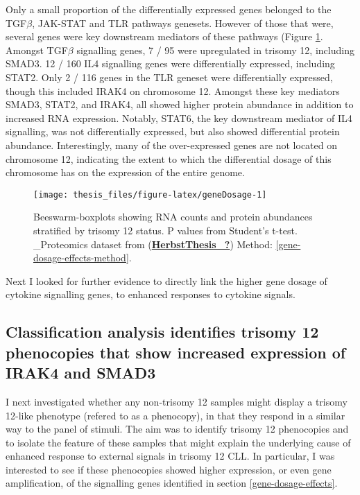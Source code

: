\documentclass[11pt, a4paper, twosided]{book}
\begin{document}
Only a small proportion of the differentially expressed genes belonged to the TGF\(\beta\), JAK-STAT and TLR pathways genesets. However of those that were, several genes were key downstream mediators of these pathways (Figure \ref{fig:geneDosage}. Amongst TGF\(\beta\) signalling genes, 7 / 95 were upregulated in trisomy 12, including SMAD3. 12 / 160 IL4 signalling genes were differentially expressed, including STAT2. Only 2 / 116 genes in the TLR geneset were differentially expressed, though this included IRAK4 on chromosome 12. Amongst these key mediators SMAD3, STAT2, and IRAK4, all showed higher protein abundance in addition to increased RNA expression. Notably, STAT6, the key downstream mediator of IL4 signalling, was not differentially expressed, but also showed differential protein abundance. Interestingly, many of the over-expressed genes are not located on chromosome 12, indicating the extent to which the differential dosage of this chromosome has on the expression of the entire genome.


\begin{figure}

{\centering \texttt{[image: thesis\_files/figure-latex/geneDosage-1]} 

}

\caption{Beeswarm-boxplots showing RNA counts and protein abundances stratified by trisomy 12 status. P values from Student's t-test. \_Proteomics dataset from (\protect\hyperlink{ref-HerbstThesis_}{\textbf{HerbstThesis\_?}}) Method: \ref{gene-dosage-effects-method}.}\label{fig:geneDosage}
\end{figure}
Next I looked for further evidence to directly link the higher gene dosage of cytokine signalling genes, to enhanced responses to cytokine signals.

\hypertarget{trisomy12-classifier}{%
\subsection{Classification analysis identifies trisomy 12 phenocopies that show increased expression of IRAK4 and SMAD3}\label{trisomy12-classifier}}

I next investigated whether any non-trisomy 12 samples might display a trisomy 12-like phenotype (refered to as a phenocopy), in that they respond in a similar way to the panel of stimuli. The aim was to identify trisomy 12 phenocopies and to isolate the feature of these samples that might explain the underlying cause of enhanced response to external signals in trisomy 12 CLL. In particular, I was interested to see if these phenocopies showed higher expression, or even gene amplification, of the signalling genes identified in section \ref{gene-dosage-effects}.
\end{document}
